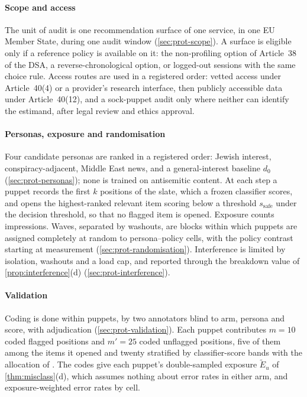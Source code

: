 \paragraph{Scope and access}
The unit of audit is one recommendation surface of one service, in one EU Member State, during one audit window (\cref{sec:prot-scope}). A surface is eligible only if a reference policy is available on it: the non-profiling option of Article~38 of the DSA, a reverse-chronological option, or logged-out sessions with the same choice rule. Access routes are used in a registered order: vetted access under Article~40(4) or a provider's research interface, then publicly accessible data under Article~40(12), and a sock-puppet audit only where neither can identify the estimand, after legal review and ethics approval.

\paragraph{Personas, exposure and randomisation}
Four candidate personas are ranked in a registered order: Jewish interest, conspiracy-adjacent, Middle East news, and a general-interest baseline $d_0$ (\cref{sec:prot-personas}); none is trained on antisemitic content. At each step a puppet records the first $k$ positions of the slate, which a frozen classifier scores, and opens the highest-ranked relevant item scoring below a threshold $s_{\mathrm{safe}}$ under the decision threshold, so that no flagged item is opened. Exposure counts impressions. Waves, separated by washouts, are blocks within which puppets are assigned completely at random to persona--policy cells, with the policy contrast starting at measurement (\cref{sec:prot-randomisation}). Interference is limited by isolation, washouts and a load cap, and reported through the breakdown value of \cref{prop:interference}(d) (\cref{sec:prot-interference}).

\paragraph{Validation}
Coding is done within puppets, by two annotators blind to arm, persona and score, with adjudication (\cref{sec:prot-validation}). Each puppet contributes $m=10$ coded flagged positions and $m'=25$ coded unflagged positions, five of them among the items it opened and twenty stratified by classifier-score bands with the allocation of \citet{neyman1934}. The codes give each puppet's double-sampled exposure $\widetilde E_u$ of \cref{thm:misclass}(d), which assumes nothing about error rates in either arm, and exposure-weighted error rates by cell.

